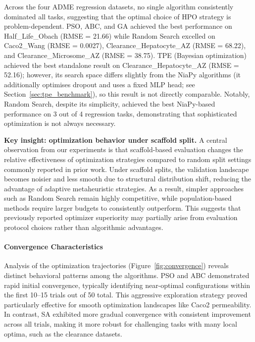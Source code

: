 \documentclass[12pt]{article}
\begin{document}
Across the four ADME regression datasets, no single algorithm consistently dominated all tasks, suggesting that the optimal choice of HPO strategy is problem-dependent. PSO, ABC, and GA achieved the best performance on Half\_Life\_Obach (RMSE = 21.66) while Random Search excelled on Caco2\_Wang (RMSE = 0.0027), Clearance\_Hepatocyte\_AZ (RMSE = 68.22), and Clearance\_Microsome\_AZ (RMSE = 38.75). TPE (Bayesian optimization) achieved the best standalone result on Clearance\_Hepatocyte\_AZ (RMSE = 52.16); however, its search space differs slightly from the NiaPy algorithms (it additionally optimises dropout and uses a fixed MLP head; see Section~\ref{sec:tpe_benchmark}), so this result is not directly comparable. Notably, Random Search, despite its simplicity, achieved the best NiaPy-based performance on 3 out of 4 regression tasks, demonstrating that sophisticated optimization is not always necessary.

\noindent\textbf{Key insight: optimization behavior under scaffold split.}
A central observation from our experiments is that scaffold-based evaluation changes the relative effectiveness of optimization strategies compared to random split settings commonly reported in prior work. Under scaffold splits,
the validation landscape becomes noisier and less smooth due to structural distribution shift, reducing the advantage of adaptive metaheuristic strategies. As a result, simpler approaches such as Random Search remain highly competitive,
while population-based methods require larger budgets to consistently outperform. This suggests that previously reported optimizer superiority may partially arise
from evaluation protocol choices rather than algorithmic advantages.

\paragraph{Convergence Characteristics}

Analysis of the optimization trajectories (Figure~\ref{fig:convergence}) reveals distinct behavioral patterns among the algorithms. PSO and ABC demonstrated rapid initial convergence, typically identifying near-optimal configurations within the first 10–15 trials out of 50 total. This aggressive exploration strategy proved particularly effective for smooth optimization landscapes like Caco2 permeability. In contrast, SA exhibited more gradual convergence with consistent improvement across all trials, making it more robust for challenging tasks with many local optima, such as the clearance datasets.
\end{document}

